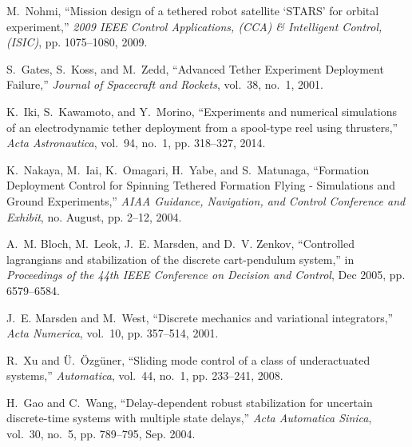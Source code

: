 \documentclass[10pt,onecolumn,draftcls]{IEEEtran}
\begin{document}
\begin{thebibliography}{10}
	M.~Nohmi, ``{Mission design of a tethered robot satellite `STARS' for orbital
		experiment},'' \emph{2009 IEEE Control Applications, (CCA) {\&} Intelligent
		Control, (ISIC)}, pp. 1075--1080, 2009.
	
	S.~Gates, S.~Koss, and M.~Zedd, ``{Advanced Tether Experiment Deployment
		Failure},'' \emph{Journal of Spacecraft and Rockets}, vol.~38, no.~1, 2001.
	
	K.~Iki, S.~Kawamoto, and Y.~Morino, ``{Experiments and numerical simulations of
		an electrodynamic tether deployment from a spool-type reel using
		thrusters},'' \emph{Acta Astronautica}, vol.~94, no.~1, pp. 318--327, 2014.
	
	K.~Nakaya, M.~Iai, K.~Omagari, H.~Yabe, and S.~Matunaga, ``{Formation
		Deployment Control for Spinning Tethered Formation Flying - Simulations and
		Ground Experiments},'' \emph{AIAA Guidance, Navigation, and Control
		Conference and Exhibit}, no. August, pp. 2--12, 2004.
	
	A.~M. Bloch, M.~Leok, J.~E. Marsden, and D.~V. Zenkov, ``Controlled lagrangians
		and stabilization of the discrete cart-pendulum system,'' in
		\emph{Proceedings of the 44th IEEE Conference on Decision and Control}, Dec
		2005, pp. 6579--6584.
	
	J.~E. Marsden and M.~West, ``Discrete mechanics and variational integrators,''
		\emph{Acta Numerica}, vol.~10, pp. 357--514, 2001.
	
	R.~Xu and {\"{U}}.~{\"{O}}zg{\"{u}}ner, ``{Sliding mode control of a class of
		underactuated systems},'' \emph{Automatica}, vol.~44, no.~1, pp. 233--241,
		2008.
	
	H.~Gao and C.~Wang, ``Delay-dependent robust stabilization for uncertain
		discrete-time systems with multiple state delays,'' \emph{Acta Automatica
		Sinica}, vol.~30, no.~5, pp. 789--795, Sep. 2004.
	
	\end{thebibliography}
	
%

\end{document}
